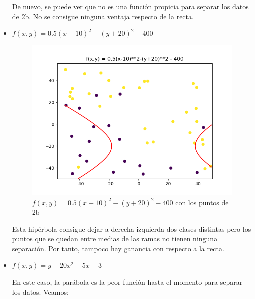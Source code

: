 \begin{itemize}
De nuevo, se puede ver que no es una función propicia para separar los datos de 2b. No se consigue ninguna ventaja respecto de la recta.

\item $f(x,y) = 0.5(x-10)^2-(y+20)^2-400$
\begin{figure}[H] %
	\centering
	\includegraphics[scale=0.5]{f3.png}  %
	\caption{$f(x,y) = 0.5(x-10)^2-(y+20)^2-400$ con los puntos de 2b} 
	\label{fig:f3}
\end{figure}

Esta hipérbola consigue dejar a derecha izquierda dos clases distintas pero los puntos que se quedan entre medias de las ramas no tienen ninguna separación. Por tanto, tampoco hay ganancia con respecto a la recta.

\item $f(x,y) =  y -20x^2-5x+3$

En este caso, la parábola es la peor función hasta el momento para separar los datos. Veamos:


\end{itemize}
